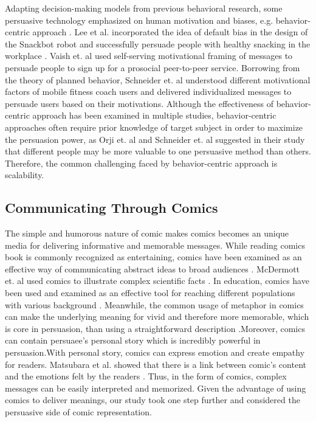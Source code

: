 Adapting decision-making models from previous behavioral research, some persuasive technology emphasized on human motivation and biases, e.g. behavior-centric approach \cite{LeeKF11}. Lee et al. incorporated the idea of default bias in the design of the Snackbot robot and successfully persuade people with healthy snacking in the workplace \cite{LeeKF11}. Vaish et. al used self-serving motivational framing of messages to persuade people to sign up for a prosocial peer-to-peer service\cite{vaish2018s}. Borrowing from the theory of planned behavior, Schneider et. al understood different motivational factors of mobile fitness coach users and delivered individualized messages to persuade users based on their motivations\cite{schneider2016understanding}. Although the effectiveness of behavior-centric approach has been examined in multiple studies, behavior-centric approaches often require prior knowledge of target subject in order to maximize the persuasion power, as Orji et. al and Schneider et. al suggested in their study that different people may be more valuable to one persuasive method than others\cite{schneider2016understanding,orji2014developing}. Therefore, the common challenging faced by behavior-centric approach is scalability.

\subsection{Communicating Through Comics}
The simple and humorous nature of comic makes comics becomes an unique media for delivering informative and memorable messages. While reading comics book is commonly recognized as entertaining, comics have been examined as an effective way of communicating abstract ideas to broad audiences \cite{McDermottPB18,cary2004going,scott1993understanding}. McDermott et. al used comics to illustrate complex scientific facts \cite{McDermottPB18}. In education, comics have been used and examined as an effective tool for reaching different populations with various background \cite{McDermottPB18,cary2004going,scott1993understanding}. Meanwhile, the common usage of metaphor in comics can make the underlying meaning for vivid and therefore more memorable, which is core in persuasion, than using a straightforward description \cite{McDermottPB18,scott1993understanding}.Moreover, comics can contain persuaee's personal story which is incredibly powerful in persuasion\cite{weaver2017losing}.With personal story, comics can express emotion and create empathy for readers. Matsubara et al. showed that there is a link between comic's content and the emotions felt by the readers \cite{matsubara2016emotional}. Thus, in the form of comics, complex messages can be easily interpreted and memorized. Given the advantage of using comics to deliver meanings, our study took one step further and considered the persuasive side of comic representation.


